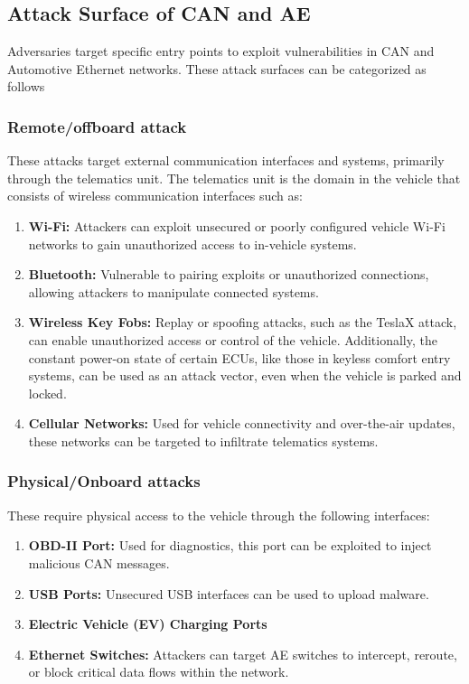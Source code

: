 \documentclass{report}
\begin{document}
\subsection{Attack Surface of CAN and AE}
Adversaries target specific entry points to exploit vulnerabilities in CAN and Automotive Ethernet networks. These attack surfaces can be categorized as follows

\subsubsection{Remote/offboard attack}
These attacks target external communication interfaces and systems, primarily through the telematics unit. The telematics unit is the domain in the vehicle that consists of wireless communication interfaces such as:

\begin{enumerate}
    \item \textbf{Wi-Fi:} Attackers can exploit unsecured or poorly configured vehicle Wi-Fi networks to gain unauthorized access to in-vehicle systems.
    \item \textbf{Bluetooth:} Vulnerable to pairing exploits or unauthorized connections, allowing attackers to manipulate connected systems.
    \item \textbf{Wireless Key Fobs:} Replay or spoofing attacks, such as the TeslaX attack, can enable unauthorized access or control of the vehicle. Additionally, the constant power-on state of certain ECUs, like those in keyless comfort entry systems, can be used as an attack vector, even when the vehicle is parked and locked.
    \item \textbf{Cellular Networks:} Used for vehicle connectivity and over-the-air updates, these networks can be targeted to infiltrate telematics systems.
\end{enumerate}

\subsubsection{Physical/Onboard attacks}
These require physical access to the vehicle through the following interfaces:

\begin{enumerate}
    \item \textbf{OBD-II Port:} Used for diagnostics, this port can be exploited to inject malicious CAN messages.
    \item \textbf{USB Ports:} Unsecured USB interfaces can be used to upload malware.
    \item \textbf{Electric Vehicle (EV) Charging Ports}
    \item \textbf{Ethernet Switches:} Attackers can target AE switches to intercept, reroute, or block critical data flows within the network.
\end{enumerate}
\end{document}
